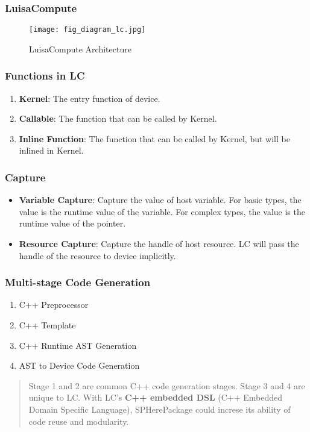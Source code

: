 \begin{frame}
    \frametitle{LuisaCompute}
    \begin{figure}
        \texttt{[image: fig\_diagram\_lc.jpg]}
        \caption[short]{LuisaCompute Architecture} \cite{zhengLuisaRenderHighPerformanceRendering2022}
    \end{figure}
\end{frame}

\begin{frame}
    \frametitle{Functions in LC}
    \begin{enumerate}
        \item \textbf{Kernel}: The entry function of device.
        \item \textbf{Callable}: The function that can be called by Kernel.
        \item \textbf{Inline Function}: The function that can be called by Kernel, but will be inlined in Kernel.
    \end{enumerate}
\end{frame}

\begin{frame}
    \frametitle{Capture}
    \begin{itemize}
        \item  \textbf{Variable Capture}: Capture the value of host variable. For basic types, the value is the runtime value of the variable. For complex types, the value is the runtime value of the pointer.
        \item  \textbf{Resource Capture}: Capture the handle of host resource. LC will pass the handle of the resource to device implicitly.
    \end{itemize}


\end{frame}

\begin{frame}
    \frametitle{Multi-stage Code Generation}
    \begin{enumerate}
        \item C++ Preprocessor
        \item C++ Template
        \item C++ Runtime AST Generation
        \item AST to Device Code Generation
    \end{enumerate}
    \begin{quote}
        Stage 1 and 2 are common C++ code generation stages. Stage 3 and 4 are unique to LC. With LC's \textbf{C++ embedded DSL} (C++ Embedded Domain Specific Language), SPHerePackage could increse its ability of code reuse and modularity.
    \end{quote}
\end{frame}

